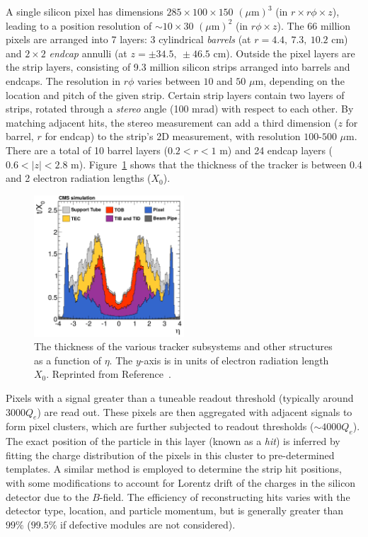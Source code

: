 A single silicon pixel has dimensions $285\times100\times150$ $(\mu\mathrm{m})^3$ (in $r\times r\phi\times z$), leading to a position resolution of $\sim10\times30$ $(\mu\mathrm{m})^2$ (in $r\phi\times z$). 
The 66 million pixels are arranged into 7 layers: 3 cylindrical \emph{barrels} (at $r=4.4,~7.3,~10.2$ cm) and $2\times2$ \emph{endcap} annulli (at $z=\pm34.5,~\pm46.5$ cm). 
Outside the pixel layers are the strip layers, consisting of 9.3 million silicon strips arranged into barrels and endcaps.
The resolution in $r\phi$ varies between $10$ and $50$ $\mu$m, depending on the location and pitch of the given strip.
Certain strip layers contain two layers of strips, rotated through a \emph{stereo} angle (100 mrad) with respect to each other.
By matching adjacent hits, the stereo measurement can add a third dimension ($z$ for barrel, $r$ for endcap) to the strip's 2D measurement, with resolution $100$-$500$ $\mu$m.
There are a total of 10 barrel layers ($0.2 < r < 1$ m) and 24 endcap layers ($0.6 < |z| < 2.8$ m). 
Figure~\ref{fig:cms:trackermat} shows that the thickness of the tracker is between 0.4 and 2 electron radiation lengths ($X_0$).

\begin{figure}[]
    \begin{center} 
        \includegraphics[width=0.5\textwidth]{figures/cms/tracker_material.png}
        \caption{The thickness of the various tracker subsystems and other structures as a function of $\eta$.
				 The $y$-axis is in units of electron radiation length $X_0$.
                 Reprinted from Reference~\cite{cmstracker}.}
        \label{fig:cms:trackermat}
    \end{center}
\end{figure}


Pixels with a signal greater than a tuneable readout threshold (typically around $3000 Q_e$) are read out.
These pixels are then aggregated with adjacent signals to form pixel clusters, which are further subjected to readout thresholds ($\sim 4000 Q_e$).
The exact position of the particle in this layer (known as a \emph{hit}) is inferred by fitting the charge distribution of the pixels in this cluster to pre-determined templates.
A similar method is employed to determine the strip hit positions, with some modifications to account for Lorentz drift of the charges in the silicon detector due to the $B$-field. 
The efficiency of reconstructing hits varies with the detector type, location, and particle momentum, but is generally greater than $99\%$ ($99.5\%$ if defective modules are not considered). 

